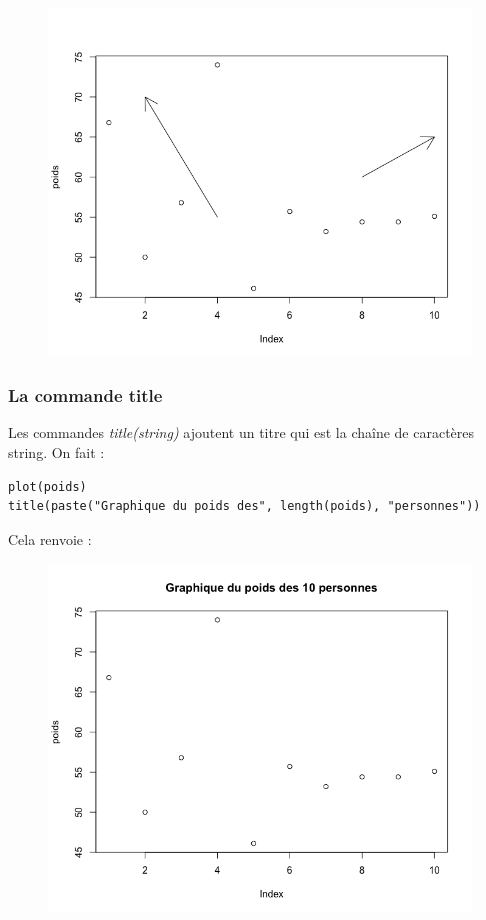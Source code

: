\begin{figure}[H]\begin{center}\includegraphics[scale=0.4]{ilu/gra63.png}\end{center}\end{figure}
\subsubsection{La commande title}
Les commandes \textit{title(string)} ajoutent un titre qui est la chaîne de caractères string.\newline
On fait :
\begin{lstlisting}[language=html]
plot(poids)
title(paste("Graphique du poids des", length(poids), "personnes"))
\end{lstlisting}
Cela renvoie :
\begin{figure}[H]\begin{center}\includegraphics[scale=0.4]{ilu/gra64.png}\end{center}\end{figure}
